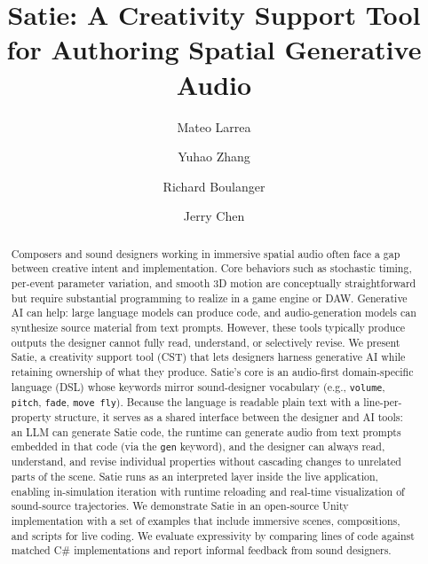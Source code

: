 \documentclass[sigconf,anonymous,review]{nimeart}
\begin{document}
\title{Satie: A Creativity Support Tool for Authoring Spatial Generative Audio}

\author{Mateo Larrea}

\author{Yuhao Zhang}

\author{Richard Boulanger}

\author{Jerry Chen}

\renewcommand{\shortauthors}{Larrea et al.}

\begin{abstract}
Composers and sound designers working in immersive spatial audio often face a gap between creative intent and implementation. Core behaviors such as stochastic timing, per-event parameter variation, and smooth 3D motion are conceptually straightforward but require substantial programming to realize in a game engine or DAW. Generative AI can help: large language models can produce code, and audio-generation models can synthesize source material from text prompts. However, these tools typically produce outputs the designer cannot fully read, understand, or selectively revise. We present Satie, a creativity support tool (CST) that lets designers harness generative AI while retaining ownership of what they produce. Satie's core is an audio-first domain-specific language (DSL) whose keywords mirror sound-designer vocabulary (e.g., \texttt{volume}, \texttt{pitch}, \texttt{fade}, \texttt{move~fly}). Because the language is readable plain text with a line-per-property structure, it serves as a shared interface between the designer and AI tools: an LLM can generate Satie code, the runtime can generate audio from text prompts embedded in that code (via the \texttt{gen} keyword), and the designer can always read, understand, and revise individual properties without cascading changes to unrelated parts of the scene. Satie runs as an interpreted layer inside the live application, enabling in-simulation iteration with runtime reloading and real-time visualization of sound-source trajectories. We demonstrate Satie in an open-source Unity implementation with a set of examples that include immersive scenes, compositions, and scripts for live coding. We evaluate expressivity by comparing lines of code against matched C\# implementations and report informal feedback from sound designers.
\end{abstract}
\end{document}
